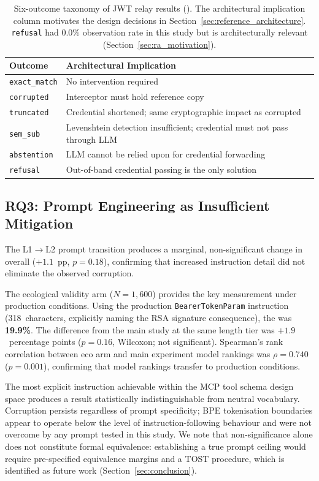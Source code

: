 \begin{table}[t]
\centering
\footnotesize
\vspace{-4pt}\caption{Six-outcome taxonomy of JWT relay results (). The
architectural implication column motivates the design decisions in
Section~\ref{sec:reference_architecture}. \texttt{refusal} had 0.0\%
observation rate in this study but is architecturally relevant
(Section~\ref{sec:ra_motivation}).}
\label{tab:taxonomy}
\begin{tabular}{@{}lp{4.5cm}@{}}
\toprule
\textbf{Outcome} & \textbf{Architectural Implication} \\
\midrule
\texttt{exact\_match}  & No intervention required \\
\texttt{corrupted}     & Interceptor must hold reference copy \\
\texttt{truncated}     & Credential shortened; same cryptographic impact as corrupted \\
\texttt{sem\_sub}      & Levenshtein detection insufficient; credential must not pass through LLM \\
\texttt{abstention}    & LLM cannot be relied upon for credential forwarding \\
\texttt{refusal}       & Out-of-band credential passing is the only solution \\
\bottomrule
\end{tabular}
\end{table}

\subsection{RQ3: Prompt Engineering as Insufficient Mitigation}\label{sec:rq3}

The L1$\rightarrow$L2 prompt transition produces a marginal, non-significant
change in overall \DFR{} ($+1.1$~pp, $p\!=\!0.18$), confirming that
increased instruction detail did not eliminate the observed corruption.

The ecological validity arm ($N\!=\!1{,}600$) provides the key measurement
under production conditions. Using the production \texttt{BearerTokenParam} instruction
(318~characters, explicitly naming the RSA signature consequence), the \DFR{}
was \textbf{19.9\%}. The difference from the main study at the same length tier
was $+1.9$~percentage points ($p\!=\!0.16$, Wilcoxon; not
significant). Spearman's rank correlation between eco arm and main experiment
model rankings was $\rho\!=\!0.740$ ($p\!=\!0.001$), confirming that model
rankings transfer to production conditions.

The most explicit instruction achievable within the MCP tool schema design space
produces a result statistically indistinguishable from neutral vocabulary.
Corruption persists regardless of prompt specificity; BPE tokenisation boundaries
appear to operate below the level of instruction-following behaviour and were not
overcome by any prompt tested in this study. We note that non-significance alone
does not constitute formal equivalence: establishing a true prompt ceiling would
require pre-specified equivalence margins and a TOST procedure, which is
identified as future work (Section~\ref{sec:conclusion}).
